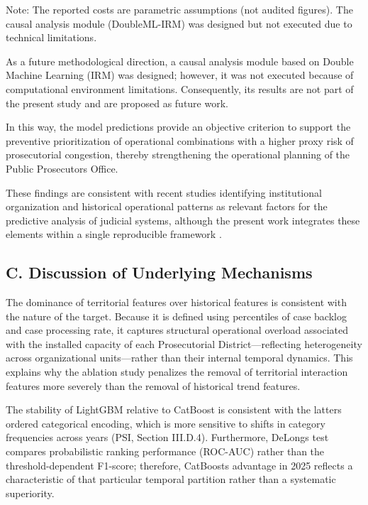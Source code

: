 \documentclass[
  number]{elsarticle}
\begin{document}
Note: The reported costs are parametric assumptions (not audited
figures). The causal analysis module (DoubleML-IRM) was designed but not
executed due to technical limitations.

As a future methodological direction, a causal analysis module based on
Double Machine Learning (IRM) was designed; however, it was not executed
because of computational environment limitations. Consequently, its
results are not part of the present study and are proposed as future
work.

In this way, the model predictions provide an objective criterion to
support the preventive prioritization of operational combinations with a
higher proxy risk of prosecutorial congestion, thereby strengthening the
operational planning of the Public Prosecutor\textquotesingle s Office.

These findings are consistent with recent studies identifying
institutional organization and historical operational patterns as
relevant factors for the predictive analysis of judicial systems,
although the present work integrates these elements within a single
reproducible framework
\citep{azaria_alleviating_2024, vasconcelos_analysis_2023}.

\subsection{C. Discussion of Underlying
Mechanisms}\label{c.-discussion-of-underlying-mechanisms}

The dominance of territorial features over historical features is
consistent with the nature of the target. Because it is defined using
percentiles of case backlog and case processing rate, it captures
structural operational overload associated with the installed capacity
of each Prosecutorial District---reflecting heterogeneity across
organizational units---rather than their internal temporal dynamics.
This explains why the ablation study penalizes the removal of
territorial interaction features more severely than the removal of
historical trend features.

The stability of LightGBM relative to CatBoost is consistent with the
latter\textquotesingle s ordered categorical encoding, which is more
sensitive to shifts in category frequencies across years (PSI, Section
III.D.4). Furthermore, DeLong\textquotesingle s test compares
probabilistic ranking performance (ROC-AUC) rather than the
threshold-dependent F1-score; therefore, CatBoost\textquotesingle s
advantage in 2025 reflects a characteristic of that particular temporal
partition rather than a systematic superiority.
\end{document}
